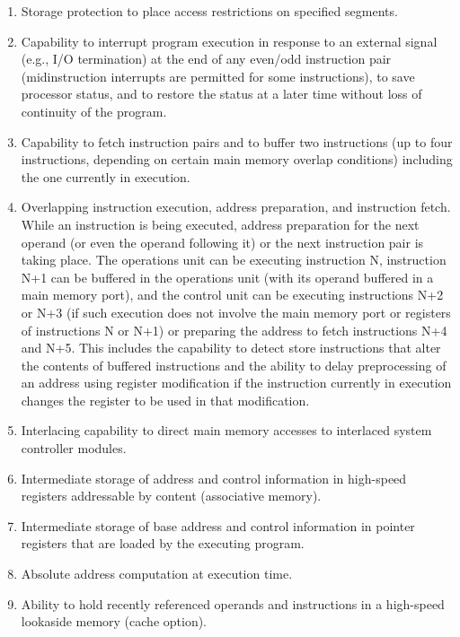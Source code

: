 \begin{enumerate}

\item
Storage protection to place access restrictions on specified segments.

\item
Capability to interrupt program execution in response to an external
signal (e.g., I/O termination) at the end of any even/odd instruction pair
(midinstruction interrupts are permitted for some instructions), to save
processor status, and to restore the status at a later time without loss of
continuity of the program.

\item
Capability to fetch instruction pairs and to buffer two instructions (up
to four instructions, depending on certain main memory overlap conditions)
including the one currently in execution.


\item
Overlapping instruction execution, address preparation, and instruction fetch.
While an instruction is being executed, address preparation for the next
operand (or even the operand following it) or the next instruction pair is
taking place. The operations unit can be executing instruction N, instruction
N+1 can be buffered in the operations unit (with its operand buffered in a main
memory port), and the control unit can be executing instructions N+2 or N+3 (if
such execution does not involve the main memory port or registers of
instructions N or N+1) or preparing the address to fetch instructions N+4 and
N+5. This includes the capability to detect store instructions that alter the
contents of buffered instructions and the ability to delay preprocessing of an
address using register modification if the instruction currently in execution
changes the register to be used in that modification.  



\item
Interlacing capability to direct main memory accesses to interlaced system
controller modules.


\item
Intermediate storage of address and control information in high-speed registers
addressable by content (associative memory).


\item
Intermediate storage of base address and control information in pointer
registers that are loaded by the executing program.


\item
Absolute address computation at execution time.

\item
Ability to hold recently referenced operands and instructions in a high-speed
lookaside memory (cache option).


\end{enumerate}




